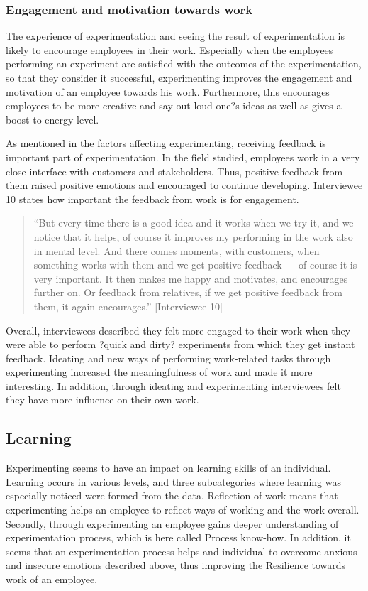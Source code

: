 \subsubsection{Engagement and motivation towards work}
The experience of experimentation and seeing the result of experimentation is likely to encourage employees in their work.  Especially when the employees performing an experiment are satisfied with the outcomes of the experimentation, so that they consider it successful, experimenting improves the engagement and motivation of an employee towards his work. Furthermore, this encourages employees to be more creative and say out loud one?s ideas as well as gives a boost to energy level.

 As mentioned in the factors affecting experimenting, receiving feedback is important part of experimentation. In the field studied, employees work in a very close interface with customers and stakeholders. Thus, positive feedback from them raised positive emotions and encouraged to continue developing. Interviewee 10 states how important the feedback from work is for engagement.
\begin{quote}
``But every time there is a good idea and it works when we try it, and we notice that it helps, of course it improves my performing in the work also in mental level. And there comes moments, with customers, when something works with them and we get positive feedback --- of course it is very important. It then makes me happy and motivates, and encourages further on. Or feedback from relatives, if we get positive feedback from them, it again encourages.'' [Interviewee 10]
\end{quote}
Overall, interviewees described they felt more engaged to their work when they were able to perform ?quick and dirty? experiments from which they get instant feedback. Ideating and new ways of performing work-related tasks through experimenting increased the meaningfulness of work and made it more interesting. In addition, through ideating and experimenting interviewees felt they have more influence on their own work.

\subsection{Learning}
Experimenting seems to have an impact on learning skills of an individual. Learning occurs in various levels, and three subcategories where learning was especially noticed were formed from the data. Reflection of work means that experimenting helps an employee to reflect ways of working and the work overall. Secondly, through experimenting an employee gains deeper understanding of experimentation process, which is here called Process know-how.  In addition, it seems that an experimentation process helps and individual to overcome anxious and insecure emotions described above, thus improving the Resilience towards work of an employee. 

